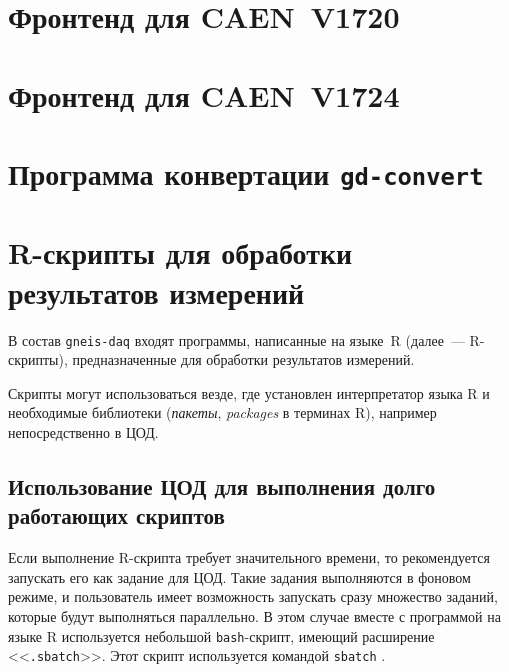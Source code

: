 \documentclass[12pt, a4paper, oneside, onecolumn]{book}
\newcommand{\GD}{{\tt gneis-daq}}
\newcommand{\APP}[1]{\mbox{\tt #1}}
\newcommand{\TERM}[1]{{\it #1}}
\newcommand{\FILE}[1]{<<{\tt #1}>>}
\newcommand{\COMMAND}[1]{{\tt #1}}
\begin{document}

\newcommand{\FE}{\APP{fe-v1720}}
\newcommand{\DEVICE}{CAEN~V1720}

\chapter{Фронтенд для \DEVICE{}}
\label{sec-fe-v1720}




\renewcommand{\FE}{\APP{fe-v1724}}
\renewcommand{\DEVICE}{CAEN~V1724}

\chapter{Фронтенд для \DEVICE{}}




\newcommand{\GDCONVERT}{\APP{gd-convert}}

\chapter{Программа конвертации \GDCONVERT}




\chapter{R-скрипты для обработки результатов измерений}

В состав \GD{} входят программы, написанные на языке~R \cite{RLang} (далее~--- R-скрипты), предназначенные для обработки результатов измерений. 

Скрипты могут использоваться везде, где установлен интерпретатор языка R и необходимые библиотеки (\TERM{пакеты}, \TERM{packages} в терминах R), например непосредственно в ЦОД.

\section{Использование ЦОД для выполнения долго работающих скриптов}

Если выполнение R-скрипта требует значительного времени, то рекомендуется запускать его как задание для ЦОД. Такие задания выполняются в фоновом режиме, и пользователь имеет возможность запускать сразу множество заданий, которые будут выполняться параллельно. В этом случае вместе с программой на языке R используется небольшой \COMMAND{bash}-скрипт, имеющий расширение \FILE{.sbatch}. Этот скрипт используется командой \COMMAND{sbatch} \cite{SlurmSbatch}.
\end{document}
